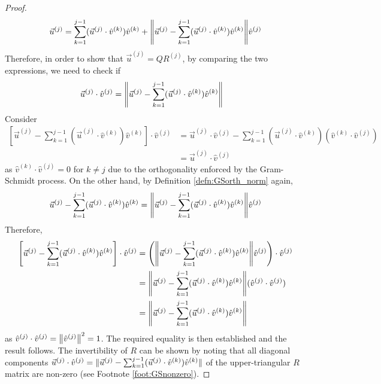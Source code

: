 \begin{proof}
\begin{align*}
\vec{u}^{(j)} = \sum_{k=1}^{j-1}(\vec{u}^{(j)} \cdot \hat{v}^{(k)})\hat{v}^{(k)} + {\norm{\vec{u}^{(j)} - \sum_{k=1}^{j-1}(\vec{u}^{(j)} \cdot \hat{v}^{(k)})\hat{v}^{(k)}}}\hat{v}^{(j)}
\end{align*}
Therefore, in order to show that $\vec{u}^{(j)} = QR^{(j)}$, by comparing the two expressions, we need to check if
\begin{align*}
\vec{u}^{(j)} \cdot \hat{v}^{(j)} &= \norm{\vec{u}^{(j)} - \sum_{k=1}^{j-1}(\vec{u}^{(j)} \cdot \hat{v}^{(k)})\hat{v}^{(k)}}
\end{align*}
Consider
\begin{align*}
\left[\vec{u}^{(j)} - \sum_{k=1}^{j-1}(\vec{u}^{(j)} \cdot \hat{v}^{(k)})\hat{v}^{(k)}\right] \cdot \hat{v}^{(j)} &= \vec{u}^{(j)} \cdot \hat{v}^{(j)} - \sum_{k=1}^{j-1}(\vec{u}^{(j)} \cdot \hat{v}^{(k)}) (\hat{v}^{(k)} \cdot \hat{v}^{(j)})\\
&= \vec{u}^{(j)} \cdot \hat{v}^{(j)}
\end{align*}
as $\hat{v}^{(k)} \cdot \hat{v}^{(j)} = 0$ for $k \neq j$ due to the orthogonality enforced by the Gram-Schmidt process. On the other hand, by Definition \ref{defn:GSorth_norm} again, 
\begin{align*}
\vec{u}^{(j)} - \sum_{k=1}^{j-1}(\vec{u}^{(j)} \cdot \hat{v}^{(k)})\hat{v}^{(k)} = \norm{\vec{u}^{(j)} - \sum_{k=1}^{j-1}(\vec{u}^{(j)} \cdot \hat{v}^{(k)})\hat{v}^{(k)}} \hat{v}^{(j)}
\end{align*}
Therefore,
\begin{align*}
\left[\vec{u}^{(j)} - \sum_{k=1}^{j-1}(\vec{u}^{(j)} \cdot \hat{v}^{(k)})\hat{v}^{(k)}\right] \cdot \hat{v}^{(j)} &= \left(\norm{\vec{u}^{(j)} - \sum_{k=1}^{j-1}(\vec{u}^{(j)} \cdot \hat{v}^{(k)})\hat{v}^{(k)}} \hat{v}^{(j)}\right) \cdot \hat{v}^{(j)} \\
&= \norm{\vec{u}^{(j)} - \sum_{k=1}^{j-1}(\vec{u}^{(j)} \cdot \hat{v}^{(k)})\hat{v}^{(k)}} (\hat{v}^{(j)} \cdot\hat{v}^{(j)}) \\
&= \norm{\vec{u}^{(j)} - \sum_{k=1}^{j-1}(\vec{u}^{(j)} \cdot \hat{v}^{(k)})\hat{v}^{(k)}}
\end{align*}
as $\hat{v}^{(j)} \cdot \hat{v}^{(j)} = \norm{\hat{v}^{(j)}}^2 = 1$. The required equality is then established and the result follows. The invertibility of $R$ can be shown by noting that all diagonal components $\vec{u}^{(j)} \cdot \hat{v}^{(j)} = \norm{\smash{\vec{u}^{(j)} - \sum_{k=1}^{j-1}(\vec{u}^{(j)} \cdot \hat{v}^{(k)})\hat{v}^{(k)}}} $ of the upper-triangular $R$ matrix are non-zero (see Footnote \ref{foot:GSnonzero}). 
\end{proof}

